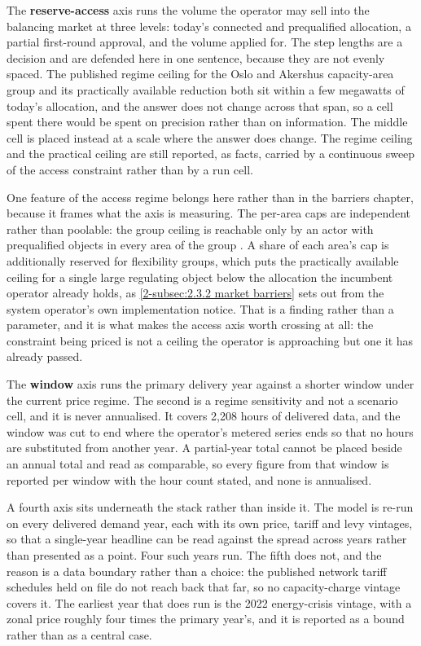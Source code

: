 The \textbf{reserve-access} axis runs the volume the operator may sell into the balancing market at three levels: today's connected and prequalified allocation, a partial first-round approval, and the volume applied for. The step lengths are a decision and are defended here in one sentence, because they are not evenly spaced. The published regime ceiling for the Oslo and Akershus capacity-area group and its practically available reduction both sit within a few megawatts of today's allocation, and the answer does not change across that span, so a cell spent there would be spent on precision rather than on information. The middle cell is placed instead at a scale where the answer does change. The regime ceiling and the practical ceiling are still reported, as facts, carried by a continuous sweep of the access constraint rather than by a run cell.

One feature of the access regime belongs here rather than in the barriers chapter, because it frames what the axis is measuring. The per-area caps are independent rather than poolable: the group ceiling is reachable only by an actor with prequalified objects in every area of the group \cite{statnett_innforing_2026}. A share of each area's cap is additionally reserved for flexibility groups, which puts the practically available ceiling for a single large regulating object below the allocation the incumbent operator already holds, as \autoref{2-subsec:2.3.2 market barriers} sets out from the system operator's own implementation notice. That is a finding rather than a parameter, and it is what makes the access axis worth crossing at all: the constraint being priced is not a ceiling the operator is approaching but one it has already passed.

The \textbf{window} axis runs the primary delivery year against a shorter window under the current price regime. The second is a regime sensitivity and not a scenario cell, and it is never annualised. It covers 2,208 hours of delivered data, and the window was cut to end where the operator's metered series ends so that no hours are substituted from another year. A partial-year total cannot be placed beside an annual total and read as comparable, so every figure from that window is reported per window with the hour count stated, and none is annualised.

A fourth axis sits underneath the stack rather than inside it. The model is re-run on every delivered demand year, each with its own price, tariff and levy vintages, so that a single-year headline can be read against the spread across years rather than presented as a point. Four such years run. The fifth does not, and the reason is a data boundary rather than a choice: the published network tariff schedules held on file do not reach back that far, so no capacity-charge vintage covers it. The earliest year that does run is the 2022 energy-crisis vintage, with a zonal price roughly four times the primary year's, and it is reported as a bound rather than as a central case.

